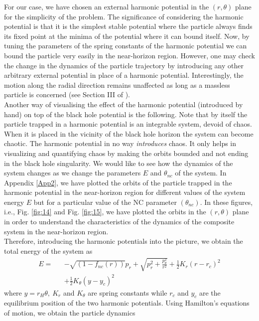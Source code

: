 \documentclass[aps,prd,showpacs,nofootinbib,floats,floatfix,preprintnumbers,groupedaddress,twocolumn]{revtex4-1}
\begin{document}
%
For our case, we have chosen an external harmonic potential in the $(r,\theta)$ plane for the simplicity of the problem. The significance of considering the harmonic potential is that it is the simplest stable potential where the particle always finds its fixed point at the minima of the potential where it can bound itself. Now, by tuning the parameters of the spring constants of the harmonic potential we can bound the particle very easily in the near-horizon region. However, one may check the change in the dynamics of the particle trajectory by introducing any other arbitrary external potential in place of a harmonic potential. Interestingly, the motion along the radial direction remains unaffected as long as a massless particle is concerned (see Section III of \cite{Dalui:2018qqv}).\\
%
%
%
%
Another way of visualising the effect of the harmonic potential (introduced by hand) on top of the black hole potential is the following. Note that  by itself the  particle trapped in a harmonic potential is an  integrable system, devoid of chaos. When it is  placed in the vicinity  of the black hole horizon the system can become chaotic. The harmonic potential in no way {\it{introduces}} chaos. It only helps in visualizing and quantifying chaos by making the orbits bounded and not ending in the black hole singularity. We would like to see how the dynamics of the system changes as we change the parameters $E$ and $\theta_{nc}$ of the system. In Appendix \ref{App2}, we have plotted the orbits of the particle trapped in the harmonic potential in the near-horizon region for different values of the system energy $E$ but for a particular value of the NC parameter $(\theta_{nc})$. In these figures, i.e., Fig. \ref{fig:14} and Fig. \ref{fig:15}, we have plotted the orbits in the $(r,\theta)$ plane in order to understand the characteristics of the dynamics of the composite system in the near-horizon region.\\
%
%
%
%
%
%
%
Therefore, introducing the harmonic potentials into the picture, we obtain the total energy of the system as
%
%
%
\begin{eqnarray}
E = &&-\sqrt{(1-f_{nc}(r))}p_r +  \sqrt{p_r^2 + \frac{ p_\theta^2}{r^2}} + \frac{1}{2}K_r (r-r_c)^2 \nonumber\\
&&+ \frac{1}{2}K_\theta (y-y_c)^2\label{energy}
\end{eqnarray}  
where $y=r_{H}\theta,~K_{r}$ and $K_{\theta}$ are spring constants while $r_c$ and $y_c$ are the equilibrium position of the two harmonic potentials. Using  Hamilton's equations of motion, we obtain  the particle dynamics
\end{document}
